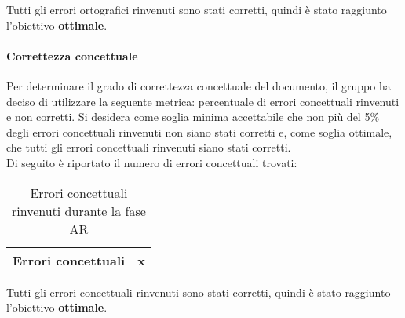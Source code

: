 \documentclass[PianoDiQualifica.tex]{subfiles}
\begin{document}
			Tutti gli errori ortografici rinvenuti sono stati corretti, quindi è stato
raggiunto l’obiettivo \textbf{ottimale}.
				
				
		\paragraph{Correttezza concettuale}
		Per determinare il grado di correttezza concettuale del documento, il gruppo ha deciso di utilizzare la seguente metrica: percentuale di errori concettuali rinvenuti e non corretti.
				Si desidera come soglia minima accettabile che non più del 5\% degli errori concettuali rinvenuti non siano stati corretti e, come soglia ottimale, che tutti gli errori
				concettuali rinvenuti siano stati corretti.\\
				Di seguito è riportato il numero di errori concettuali trovati:\\
				
					\begin{table}[h]
				\centering
				\begin{tabular}{l c}
					\hline
					\rule[0cm]{0cm}{0.4cm}
					Errori concettuali & x \\
					\hline
				\end{tabular}
				\caption{Errori concettuali rinvenuti durante la fase AR}
			\end{table}	
			
			Tutti gli errori concettuali rinvenuti sono stati corretti, quindi è stato
raggiunto l’obiettivo \textbf{ottimale}.
\end{document}
